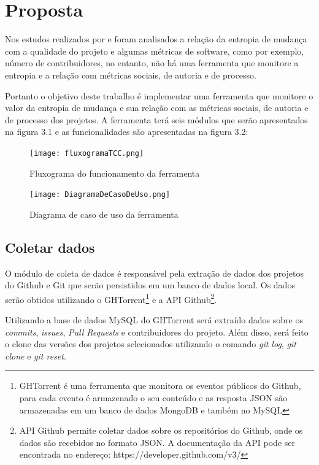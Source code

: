 \chapter{Proposta}
Nos estudos realizados por  e  foram analisados a relação da entropia de mudança com a qualidade do projeto e algumas métricas de software, como por exemplo, número de contribuidores, no entanto, não há uma ferramenta que monitore a entropia e a relação com métricas sociais, de autoria e de processo.

Portanto o objetivo deste trabalho é implementar uma ferramenta que monitore o valor da entropia de mudança e sua relação com as métricas sociais, de autoria e de processo dos projetos. A ferramenta terá seis módulos que serão apresentados na figura 3.1 e as funcionalidades são apresentadas na figura 3.2:

\begin{figure}[H]
	\captionsetup{justification=centering}
	\texttt{[image: fluxogramaTCC.png]}
	\caption{Fluxograma do funcionamento da ferramenta}
	\label{figura:fluxogramaimagem}
\end{figure}

\begin{figure}[H]
	\captionsetup{justification=centering}
	\texttt{[image: DiagramaDeCasoDeUso.png]}
	\caption{Diagrama de caso de uso da ferramenta}
	\label{figura:diagramacaso}
\end{figure}

\section{Coletar dados}
O módulo de coleta de dados é responsável pela extração de dados dos projetos do Github e Git que serão persistidos em um banco de dados local. Os dados serão obtidos utilizando o GHTorrent\footnote{GHTorrent é uma ferramenta que monitora os eventos públicos do Github, para cada evento é armazenado o seu conteúdo e as resposta JSON são armazenadas em um banco de dados MongoDB e também no MySQL} e a API Github\footnote{API Github permite coletar dados sobre os repositórios do Github, onde os dados são recebidos no formato JSON. A documentação da API pode ser encontrada no endereço: https://developer.github.com/v3/}.

Utilizando a base de dados MySQL do GHTorrent será extraído dados sobre os \textit{commits}, \textit{issues}, \textit{Pull Requests} e contribuidores do projeto. Além disso, será feito o clone das versões dos projetos selecionados utilizando o comando \textit{git log}, \textit{git clone} e \textit{git reset}. 

